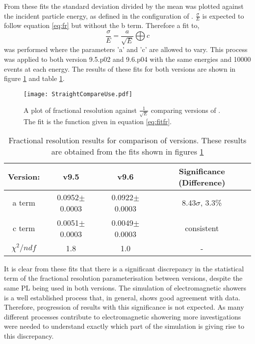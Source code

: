 From these fits the standard deviation divided by the mean was plotted against the incident particle energy, as defined in the configuration of \geant.  $\frac{\sigma}{E}$ is expected to follow equation \ref{eq:fr} but without the b term. Therefore a fit to,
\begin{equation}
  \label{eq:fitfr}
  \frac{\sigma}{E}=\frac{a}{\sqrt{E}}\bigoplus c
\end{equation}
was performed where the parameters 'a' and 'c' are allowed to vary.  This process was applied to both \geant version 9.5.p02 and 9.6.p04 with the same energies and 10000 events at each energy.  The results of these fits for both \geant versions are shown in figure \ref{fig:straightres} and table \ref{tab:results}.
\begin{figure}[h]
  \centering
  \texttt{[image: StraightCompareUse.pdf]}
  \caption{A plot of fractional resolution against $\frac{1}{\sqrt{E}}$ comparing versions of \geant. The fit is the function given in equation \ref{eq:fitfr}.}
  \label{fig:straightres}
\end{figure}

\begin{table}[h]
  \centering
  \begin{tabular}{|c|c|c|c|}
      \hline
      Version: & v9.5 & v9.6 & Significance (Difference)  \\ \hline
      a term    & 0.0952$\pm$0.0003 & 0.0922$\pm$0.0003  & 8.43$\sigma$, 3.3\% \\ \hline
      c term    & 0.0051$\pm$0.0003 & 0.0049$\pm$0.0003 & consistent \\ \hline
      $\chi^2/ndf$   &1.8  & 1.0 &  - \\ \hline
  \end{tabular}
  \caption{Fractional resolution results for comparison of \geant versions.  These results are obtained from the fits shown in figures \ref{fig:straightres}}
  \label{tab:results}
\end{table}

It is clear from these fits that there is a significant discrepancy in the statistical term of the fractional resolution parameterisation between \geant versions, despite the same PL being used in both versions.  The simulation of electromagnetic showers is a well established process that, in general, shows good agreement with data.  Therefore, progression of results with this significance is not expected.  As many different processes contribute to electromagnetic showering more investigations were needed to understand exactly which part of the simulation is giving rise to this discrepancy.

